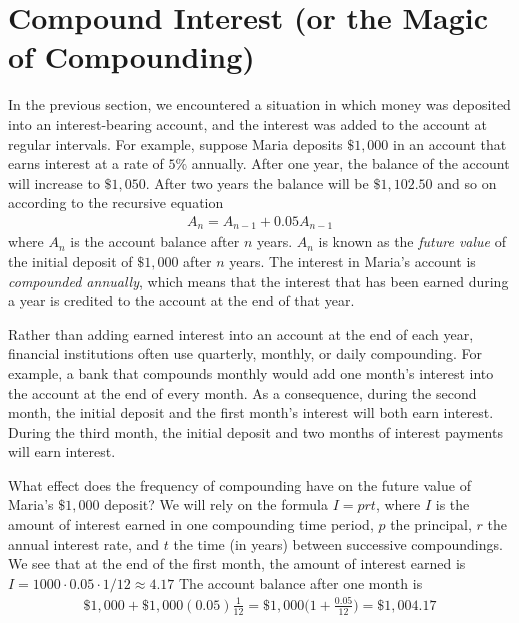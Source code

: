 \documentclass[10pt,]{book}
\theoremstyle{plain}
\theoremstyle{definition}
\theoremstyle{definition}
\theoremstyle{definition}
\numberwithin{equation}{section}
\begin{document}
\section[{Compound Interest (or the Magic of Compounding)}]{Compound Interest (or the Magic of Compounding)}\label{chapter04-section05}
\hypertarget{p-196}{}%
In the previous section, we encountered a situation in which money was deposited into an interest-bearing account, and the interest was added to the account at regular intervals.  For example, suppose Maria deposits \(\$1,000\) in an account that earns interest at a rate of \(5\%\) annually.  After one year, the balance of the account will increase to \(\$1,050\).  After two years the balance will be \(\$1,102.50\) and so on according to the recursive equation%
%
\begin{gather*}
A_n = A_{n-1} + 0.05 A_{n-1}
\end{gather*}
\hypertarget{p-197}{}%
where \(A_n\) is the account balance after \(n\) years. \(A_n\) is known as the \emph{future value} of the initial deposit of \(\$1,000\) after \(n\) years.  The interest in Maria's account is \emph{compounded annually}, which means that the interest that has been earned during a year is credited to the account at the end of that year.%
\par
\hypertarget{p-198}{}%
Rather than adding earned interest into an account at the end of each year, financial institutions often use quarterly, monthly, or daily compounding.  For example, a bank that compounds monthly would add one month's interest into the account at the end of every month. As a consequence, during the second month, the initial deposit and the first month's interest will both earn interest.  During the third month, the initial deposit and two months of interest payments will earn interest.%
\par
\hypertarget{p-199}{}%
What effect does the frequency of compounding have on the future value of Maria's \(\$1,000\) deposit?  We will rely on the formula \(I=prt\), where \(I\) is the amount of interest earned in one compounding time period, \(p\) the principal, \(r\) the annual interest rate, and \(t\) the time (in years) between successive compoundings. We see that at the end of the first month, the amount of interest earned is \(I=1000 \cdot 0.05 \cdot 1/12 \approx 4.17\)  The account balance after one month is%
%
\begin{gather*}
\$1,000 + \$1,000(0.05) \frac{1}{12} = \$1,000 \bigg( 1 + \frac{0.05}{12}\bigg) = \$1,004.17
\end{gather*}
\end{document}
